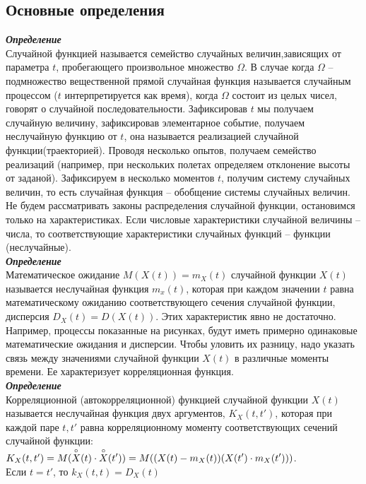 \documentclass[russian, 12pt, fleqn]{article}
\begin{document}
\subsection{Основные определения}
\noindent
\textit{\textbf{Определение}}\\ 
Случайной функцией называется семейство случайных величин,зависящих от параметра $t$, пробегающего произвольное множество $\Omega$. В случае когда $\Omega$ -- подмножество вещественной прямой случайная функция называется случайным процессом ($t$ интерпретируется как время), когда $\Omega$ состоит из целых чисел, говорят о случайной последовательности. 
Зафиксировав $t$ мы получаем случайную величину, зафиксировав элементарное событие, получаем неслучайную функцию от $t$, она называется реализацией случайной 
функции(траекторией). Проводя несколько опытов, получаем семейство реализаций (например, при нескольких полетах определяем отклонение высоты от заданой). 
Зафиксируем в несколько моментов $t$, получим систему случайных величин, то есть случайная функция -- обобщение системы случайных величин. 
Не будем рассматривать законы распределения случайной функции, остановимся только на характеристиках. Если числовые характеристики случайной величины -- числа, то соответствующие характеристики случайных функций -- функции (неслучайные).\\
\textit{\textbf{Определение}}\\ 
Математическое ожидание $M(X(t)) = m_X(t)$ случайной функции $X(t)$ называется неслучайная функция $m_x(t)$, которая при каждом значении $t$ равна математическому ожиданию соответствующего сечения случайной функции, дисперсия $D_X(t) = D(X(t))$.
Этих характеристик явно не достаточно. Например, процессы показанные на рисунках, будут иметь примерно одинаковые математические ожидания и дисперсии. Чтобы уловить их разницу, надо указать связь между значениями случайной функции $X(t)$ в различные моменты времени. Ее характеризует корреляционная функция.\\
\textit{\textbf{Определение}}\\ 
Корреляционной (автокорреляционной) функцией случайной функции $X(t)$ называется неслучайная функция двух аргументов, $K_{X}(t, t') $, которая при каждой паре $t, t'$ равна корреляционному моменту соответствующих сечений случайной функции:$K_X(t, t') = M(  
\displaystyle{\buildrel\circ\over X}(t) 
\cdot 
\displaystyle{\buildrel\circ\over X}(t'))
 = M((X(t) - m_X(t)) (X(t') \cdot  m_X(t') ) ) $.\\
Если $t=t'$, то $k_X(t, t) = D_X(t)$\\
\end{document}
